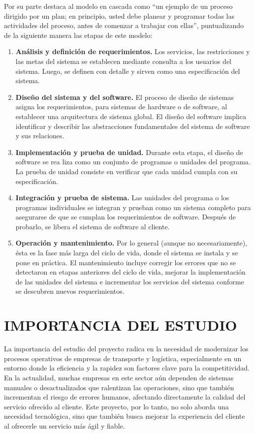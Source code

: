 \documentclass[12pt,letterpaper]{article}
\begin{document}
Por su parte \cite{sommerville2011introduccion} destaca al modelo en cascada como “un ejemplo de un proceso dirigido por un plan; en principio, usted debe planear y programar todas las actividades del proceso, antes de comenzar a trabajar con ellas”, puntualizando de la siguiente manera las etapas de este modelo:

\begin{enumerate}[nosep, left=0cm, labelsep = 1cm]
	
	\item \textbf{Análisis y definición de requerimientos.} Los servicios, las restricciones y las metas del sistema se establecen mediante consulta a los usuarios del sistema. Luego, se definen con detalle y sirven como una especificación del sistema.	
	\item \textbf{Diseño del sistema y del software.} El proceso de diseño de sistemas asigna los requerimientos, para sistemas de hardware o de software, al establecer una arquitectura de sistema global. El diseño del software implica identificar y describir las abstracciones fundamentales del sistema de software y sus relaciones.
	\item \textbf{Implementación y prueba de unidad.} Durante esta etapa, el diseño de software se rea liza como un conjunto de programas o unidades del programa. La prueba de unidad consiste en verificar que cada unidad cumpla con su especificación.
	\item \textbf{Integración y prueba de sistema.} Las unidades del programa o los programas individuales se integran y prueban como un sistema completo para asegurarse de que se cumplan los requerimientos de software. Después de probarlo, se libera el sistema de software al cliente.
	\item \textbf{Operación y mantenimiento.} Por lo general (aunque no necesariamente), ésta es la fase más larga del ciclo de vida, donde el sistema se instala y se pone en práctica. El mantenimiento incluye corregir los errores que no se detectaron en etapas anteriores del ciclo de vida, mejorar la implementación de las unidades del sistema e incrementar los servicios del sistema conforme se descubren nuevos requerimientos.
\end{enumerate}

\section{IMPORTANCIA DEL ESTUDIO}

La importancia del estudio del proyecto radica en la necesidad de modernizar los procesos operativos de empresas de transporte y logística, especialmente en un entorno donde la eficiencia y la rapidez son factores clave para la competitividad. En la actualidad, muchas empresas en este sector aún dependen de sistemas manuales o desactualizados que ralentizan las operaciones, sino que también incrementan el riesgo de errores humanos, afectando directamente la calidad del servicio ofrecido al cliente. Este proyecto, por lo tanto, no solo aborda una necesidad tecnológica, sino que también busca mejorar la experiencia del cliente al ofrecerle un servicio más ágil y fiable.
\end{document}

